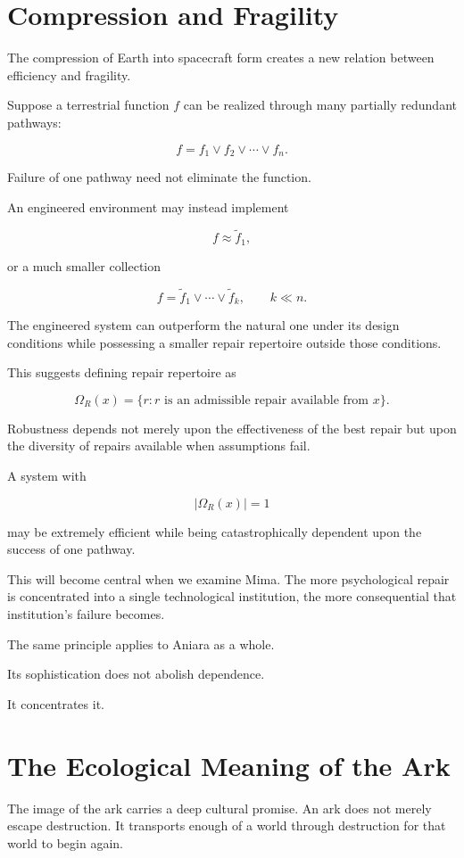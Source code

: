 \documentclass[11pt,oneside]{book}
\theoremstyle{definition}
\theoremstyle{remark}
\begin{document}
\section{Compression and Fragility}

The compression of Earth into spacecraft form creates a new relation between efficiency and fragility.

Suppose a terrestrial function \(f\) can be realized through many partially redundant pathways:

\[
f
=
f_1\lor f_2\lor\cdots\lor f_n.
\]

Failure of one pathway need not eliminate the function.

An engineered environment may instead implement

\[
f\approx\tilde f_1,
\]

or a much smaller collection

\[
f
=
\tilde f_1\lor\cdots\lor\tilde f_k,
\qquad
k\ll n.
\]

The engineered system can outperform the natural one under its design conditions while possessing a smaller repair repertoire outside those conditions.

This suggests defining repair repertoire as

\[
\Omega_R(x)
=
\{
r:
r\text{ is an admissible repair available from }x
\}.
\]

Robustness depends not merely upon the effectiveness of the best repair but upon the diversity of repairs available when assumptions fail.

A system with

\[
|\Omega_R(x)|=1
\]

may be extremely efficient while being catastrophically dependent upon the success of one pathway.

This will become central when we examine Mima. The more psychological repair is concentrated into a single technological institution, the more consequential that institution's failure becomes.

The same principle applies to Aniara as a whole.

Its sophistication does not abolish dependence.

It concentrates it.

\section{The Ecological Meaning of the Ark}

The image of the ark carries a deep cultural promise. An ark does not merely escape destruction. It transports enough of a world through destruction for that world to begin again.
\end{document}
